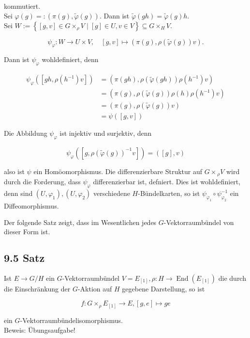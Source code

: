 \documentclass[10pt, letterpaper]{article}
\begin{document}
kommutiert.\\
Sei $\varphi(g)=:(\pi(g), \tilde{\varphi}(g))$. Dann ist $\tilde{\varphi}(g h)=\tilde{\varphi}(g) h$.\\
Sei $W:=\left\{[g, v] \in G \times_{\rho} V \mid[g] \in U, v \in V\right\} \subseteq G \times_{H} V$.

$$
\psi_{\varphi}: W \rightarrow U \times V, \quad[g, v] \mapsto(\pi(g), \rho(\tilde{\varphi}(g)) v) .
$$

Dann ist $\psi_{\varphi}$ wohldefiniert, denn

$$
\begin{aligned}
\psi_{\varphi}\left(\left[g h, \rho\left(h^{-1}\right) v\right]\right) & =\left(\pi(g h), \rho(\tilde{\varphi}(g h)) \rho\left(h^{-1}\right) v\right) \\
& =\left(\pi(g), \rho(\tilde{\varphi}(g)) \rho(h) \rho\left(h^{-1}\right) v\right) \\
& =(\pi(g), \rho(\tilde{\varphi}(g)) v) \\
& =\psi([g, v])
\end{aligned}
$$

Die Abbildung $\psi_{\varphi}$ ist injektiv und surjektiv, denn

$$
\psi_{\varphi}\left(\left[g, \rho(\tilde{\varphi}(g))^{-1} v\right]\right)=([g], v)
$$

also ist $\psi$ ein Homöomorphismus. Die differenzierbare Struktur auf $G \times{ }_{\rho} V$ wird durch die Forderung, dass $\psi_{\varphi}$ differenzierbar ist, defniert. Dies ist wohldefiniert, denn sind $\left(U, \varphi_{1}\right),\left(U, \varphi_{2}\right)$ verschiedene $H$-Bündelkarten, so ist $\psi_{\varphi_{1}} \circ \psi_{\varphi_{2}}^{-1}$ ein Diffeomorphismus.

Der folgende Satz zeigt, dass im Wesentlichen jedes $G$-Vektorraumbündel von dieser Form ist.

\subsection*{9.5 Satz}
Ist $E \rightarrow G / H$ ein $G$-Vektorraumbündel $V=E_{[1]}, \rho: H \rightarrow \operatorname{End}\left(E_{[1]}\right)$ die durch die Einschränkung der $G$-Aktion auf $H$ gegebene Darstellung, so ist

$$
f: G \times_{\rho} E_{[1]} \rightarrow E,[g, e] \mapsto g e
$$

ein $G$-Vektorraumbündelisomorphismus.\\
Beweis: Übungsaufgabe!
\end{document}
